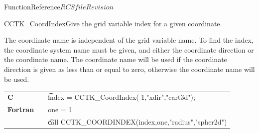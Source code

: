 \begin{cactuspart}{FunctionReference}{$RCSfile$}{$Revision$}
\begin{CCTKFunc}{CCTK\_CoordIndex}{Give the grid variable index for a given coordinate.}
\label{CCTK-CoordIndex}
\showargs
\begin{params}
\end{params}
\begin{discussion}
The coordinate name is independent of the grid variable name.
To find the index, the coordinate system name must be given, and either
the coordinate direction or the coordinate name. The coordinate name
will be used if the coordinate direction is given as less than or equal to zero, otherwise the coordinate name will be used.
\end{discussion}
\begin{examples}
\begin{tabular}{@{}p{3cm}cp{11cm}}
\hfill {\bf C} && {\t index = CCTK\_CoordIndex(-1,"xdir","cart3d")};
\\
\hfill {\bf Fortran} && one = 1
\\
&& {\t call  CCTK\_COORDINDEX(index,one,"radius","spher2d")}
\\
\end{tabular}
\end{examples}
\begin{errorcodes}
\end{errorcodes}
\end{CCTKFunc}


\end{cactuspart}
